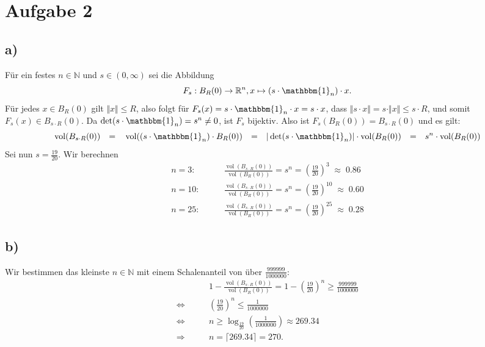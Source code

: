 \documentclass{article}
\newcommand{\NN}{\mathbb{N}}
\newcommand{\RR}{\mathbb{R}}
\newcommand{\imp}{\mathbb{\Rightarrow}}
\newcommand{\equ}{\mathbb{\Leftrightarrow}}
\newcommand{\eq}{\mathbb{\quad = \quad}}
\DeclareMathOperator{\vol}{vol}
\begin{document}
\newpage

\section*{Aufgabe 2}

\subsection*{a)}

Für ein festes $n \in \NN$ und $s \in (0, \infty)$
sei die Abbildung
$$
F_s: B_{R}(0) \to \RR^n , x \mapsto (s \cdot \mathbbm{1}_n) \cdot x.
$$
Für jedes $x \in B_R(0)$ gilt $\Vert x \Vert \leq R$,
also folgt für $F_s(x) = s \cdot \mathbbm{1}_n \cdot x = s \cdot x$,
dass $\Vert s \cdot x \Vert = s \cdot \Vert x \Vert \leq s \cdot R$,
und somit $F_s(x) \in B_{s\cdot R}(0)$.
Da $\det(s \cdot \mathbbm{1}_n) = s^n \neq 0$,
ist $F_s$ bijektiv.
Also ist $F_s(B_{R}(0)) = B_{s \cdot R}(0)$ und es gilt:
$$
\vol(B_{s \cdot R}(0)) \eq
\vol((s \cdot \mathbbm{1}_n) \cdot B_{R}(0)) \eq
|\det(s \cdot \mathbbm{1}_n)| \cdot \vol(B_R(0)) \eq 
s^n \cdot \vol(B_R(0))
$$
Sei nun $s = \frac{19}{20}$.
Wir berechnen
\begin{align*}
  n=3: \qquad & \frac{\vol(B_{s\cdot R}(0))}{\vol(B_R(0))}
  = s^n = \left(\frac{19}{20}\right)^3 \;\approx\; 0.86 \\
  n=10: \qquad & \frac{\vol(B_{s\cdot R}(0))}{\vol(B_R(0))}
  = s^n = \left(\frac{19}{20}\right)^{10} \;\approx\; 0.60 \\
  n=25: \qquad & \frac{\vol(B_{s\cdot R}(0))}{\vol(B_R(0))}
  = s^n = \left(\frac{19}{20}\right)^{25} \;\approx\; 0.28
\end{align*}

\subsection*{b)}
Wir bestimmen das kleinste $n \in \NN$
mit einem Schalenanteil von über $\frac{999999}{1000000}$:
\begin{align*}
  &1 -\frac{\vol(B_{s\cdot R}(0))}{\vol(B_R(0))} = 1- \left(\frac{19}{20}\right)^n
  \geq \frac{999999}{1000000} \\
  \equ\qquad &\left(\frac{19}{20}\right)^n \leq \frac{1}{1000000} \\
  \equ\qquad &n \geq \log_{\frac{19}{20}}\left(\frac{1}{1000000}\right) \approx 269.34 \\
  \imp \qquad & n = \lceil 269.34 \rceil = 270.
\end{align*}
\end{document}
